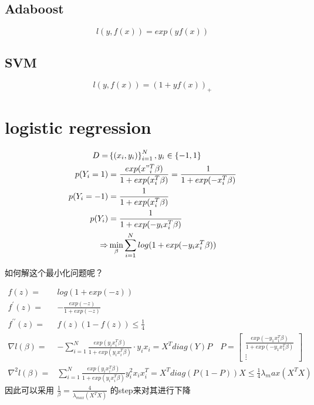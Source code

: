 \documentclass[lang=cn,11pt,a4paper]{elegantpaper}
\theoremstyle{plain}
\theoremstyle{remark}
\begin{document}
\subsection{Adaboost}
$$ l(y,f(x)) = exp(yf(x)) $$
\subsection{SVM}
$$ l(y,f(x)) = (1+yf(x))_{+} $$

\section{logistic regression}
\begin{equation}
    \begin{aligned}
        D =& \left\{ (x_i,y_i) \right\}_{i=1}^N,y_i \in \left\{ -1,1 \right\}  \\
        p(Y_i= 1) &= \frac{exp(x"_i^T\beta)}{1+exp(x_i^T\beta)} = \frac{1}{1+exp(-x_i^T\beta)}\\
        p(Y_i=-1) &= \frac{1}{1+exp(x_i^T\beta)}\\
        p(Y_i) &= \frac{1}{1+exp(-y_ix_i^T\beta)}\\
        \Rightarrow& \min _{\beta} \sum_{i=1}^{N} log(1+exp(-y_ix_i^T\beta)) 
    \end{aligned}
\end{equation}

如何解这个最小化问题呢？

\begin{equation*}
    \begin{aligned}
        f(z) = &log(1+exp(-z))\\
        f^{\prime}(z) =& -\frac{exp(-z)}{1+exp(-z)}\\
        f^{\prime\prime}(z) =& f(z)(1-f(z)) \leq \frac{1}{4}\\
        \nabla {l(\beta)} =& -\sum_{i=1}^{N}\frac{exp(y_ix_i^T\beta)}{1+exp(y_ix_i^T\beta)}\cdot y_ix_i = X^Tdiag(Y)P \quad
        P = \left[\begin{array}{c}
            \frac{exp(-y_1x_1^T\beta)}{1+exp(-y_1x_1^T\beta)}\\\vdots 
        \end{array}\right]\\
        \nabla ^2{l(\beta)} =& \sum_{i=1}^{N}\frac{exp(y_ix_i^T\beta)}{1+exp(y_ix_i^T\beta)}y_i^2x_ix_i^T = X^Tdiag(P(1-P))X \leq \frac{1}{4}\lambda _max(X^TX)
    \end{aligned}
\end{equation*}
因此可以采用 $\frac{1}{\beta} = \frac{4}{\lambda_{max}(X^TX)}$ 的step来对其进行下降 
\end{document}
